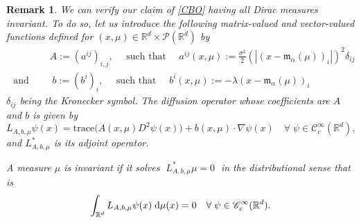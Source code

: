 \documentclass[12pt]{amsart}
\newcommand{\D}[1]{\mbox{\rm #1}}
\newcommand{\dd}{\D{d}}
\numberwithin{equation}{section}
\newtheorem{remark}[theorem]{Remark}
\begin{document}
\begin{remark}\label{rem: dirac inv}
    We can verify our claim of \eqref{CBO} having all Dirac measures invariant. 
    To do so, let us introduce the following matrix-valued and vector-valued functions defined for $(x,\mu) \in \mathbb{R}^d \times \mathscr{P}(\mathbb{R}^d)$ by
    \begin{align*}
    	&A:=(a^{ij})_{i,j}, \quad \text{ such that } \quad a^{ij}(x,\mu):=\frac{\sigma^2}{2}(|(x-\mathfrak{m}_{\alpha}(\mu))_i|)^2\delta_{ij} \\
        \mbox{ and } \quad & \; b :=(b^i)_{i},  \quad \text{ such that } \quad b^i(x,\mu):=- \lambda(x-\mathfrak{m}_{\alpha}(\mu))_i
    \end{align*}
    $\delta_{ij}$ being the Kronecker symbol. 
    The diffusion operator whose coefficients are $A$ and $b$ is given by
    \begin{equation*}
        L_{A,b,\mu}\psi(x) =  \text{trace}\big(A(x,\mu)D^2\psi(x)\big) + 
        b(x,\mu) \cdot \nabla\psi(x) \quad \forall \; \psi \in \mathscr{C}_c^\infty (\mathbb{R}^d),
    \end{equation*}
    and $L_{A,b,\mu}^{*}$ is its adjoint operator. 
    
    A measure $\mu$ is invariant if it solves $\; L_{A,b,\mu}^{*}\mu=0 \; $ in the distributional sense that is
    \begin{equation}\label{dist}
        \int_{\mathbb{R}^d} L_{A,b,\mu}\psi(x)\; \dd \mu(x) =0 \quad \forall \; \psi \in \mathscr{C}_c^\infty (\mathbb{R}^d).
    \end{equation}
    

\end{remark}
\end{document}
